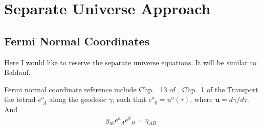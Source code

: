 %
%
%
%
%
%
%
%
%
%
%
%

\section{Separate Universe Approach}

\subsection{Fermi Normal Coordinates}
Here I would like to reserve the separate universe equations. It will be similar to Baldauf. 


Fermi normal coordinate reference include Chp.~ 13 of \cite{misner1973gravitation}, Chp.~1 of \cite{poisson2004relativist} the \cite{manasse1963fermi}
Transport the tetrad $e^a_{\;A}$ along the geodesic $\gamma$, such that  $e^a_{\;\;0}=u^{a}(\tau)$, where $\mathbf{u}=d\gamma/d\tau$. And
\begin{align} 
g_{ab} e^a_{\;\;A}e^b_{\;\;B}= \eta_{AB} ~.
\end{align} 

